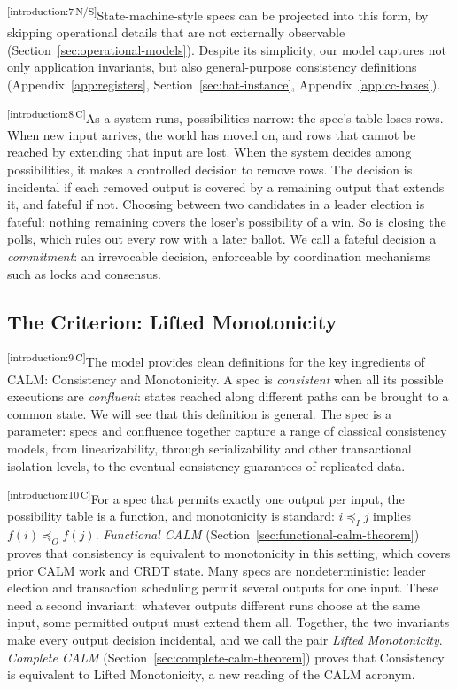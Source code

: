 \documentclass[sigconf]{cidr-2027}
\theoremstyle{remark}
\newcommand{\InputOrd}{\preceq_I}
\newcommand{\OutputOrd}{\preceq_O}
\newcommand{\commitment}{commitment\xspace}
\newcommand{\outrel}{extends\xspace}          %
\newcommand{\outrelbase}{extend\xspace}       %
\newcommand{\cxtag}[2]{\textsuperscript{\textsf{\tiny[#1\,#2]}}}
\begin{document}
\color{black}\cxtag{introduction:7}{N/S}State-machine-style specs can be projected into this form, by skipping
operational details that are not externally observable (Section~\ref{sec:operational-models}).
Despite its simplicity, our model captures not only application invariants,
but also general-purpose consistency definitions (Appendix~\ref{app:registers},
Section~\ref{sec:hat-instance}, Appendix~\ref{app:cc-bases}).\color{black}

\color{black!45}\cxtag{introduction:8}{C}As a system runs, possibilities narrow: the spec's table loses rows.  When new
input arrives, the world has moved on, and rows that cannot be reached by
extending that input are lost.  When the system decides among possibilities, it
makes a controlled decision to remove rows.  The decision is incidental if each
removed output is covered by a remaining output that \outrel it, and fateful if
not.  Choosing between two candidates in a leader election is fateful: nothing
remaining covers the loser's possibility of a win.  So is closing the polls,
which rules out every row with a later ballot.  We call a fateful decision a
\emph{\commitment}: an irrevocable decision, enforceable by coordination
mechanisms such as locks and consensus.\color{black}

\subsection{The Criterion: Lifted Monotonicity}
\color{black!45}\cxtag{introduction:9}{C}The model provides clean definitions for the key ingredients of CALM:
Consistency and Monotonicity.  A spec is \emph{consistent} when all its possible
executions are \emph{confluent}: states reached along different paths can be
brought to a common state.  We will see that this definition is general.  The spec is a parameter:
specs and confluence together capture a range of classical consistency models,
from linearizability, through serializability and other transactional isolation
levels, to the eventual consistency guarantees of replicated data.\color{black}

\color{black!45}\cxtag{introduction:10}{C}For a spec that permits exactly one output per input, the possibility table is a
function, and monotonicity is standard: $i\InputOrd j$ implies
$f(i)\OutputOrd f(j)$.  \emph{Functional CALM} (Section~\ref{sec:functional-calm-theorem})
proves that consistency is equivalent to monotonicity in this setting, which
covers prior CALM work and CRDT state.  Many specs are nondeterministic: leader
election and transaction scheduling permit several outputs for one input.
These need a second invariant: whatever outputs different runs choose at the
same input, some permitted output must \outrelbase them all.  Together, the two
invariants make every output decision incidental, and we call the pair
\emph{Lifted Monotonicity}.  \emph{Complete CALM} (Section~\ref{sec:complete-calm-theorem})
proves that Consistency is equivalent to Lifted Monotonicity, a new reading of
the CALM acronym.\color{black}
\end{document}
